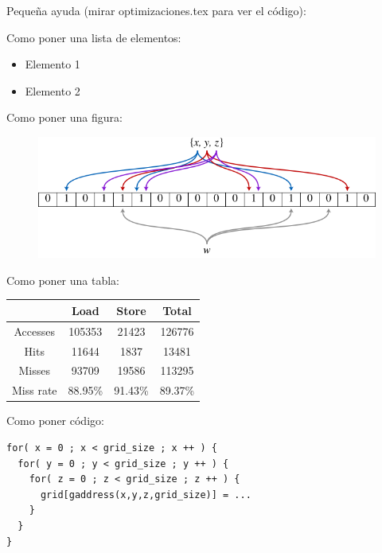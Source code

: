 Peque\~{n}a ayuda (mirar optimizaciones.tex para ver el c\'{o}digo):

Como poner una lista de elementos:
\begin{itemize}
   \item Elemento 1
   \item Elemento 2
\end{itemize}

Como poner una figura:
\begin{figure}[ht]
   \centering
   \includegraphics[keepaspectratio=true,width=.6\textwidth]{figures/muestra}
\end{figure}

Como poner una tabla:
\begin{center}
   \begin{tabular}{| c || c | c | c |}
      \hline
      	           & Load	& Store		& Total		\\ \hline \hline
	Accesses   & 105353	& 21423		& 126776	\\ \hline
	Hits       &  11644	&  1837		&  13481	\\ \hline
	Misses     &  93709 	& 19586		& 113295	\\ \hline
	Miss rate  & 88.95\%	& 91.43\%	& 89.37\%	\\ \hline
   \end{tabular}
\end{center}

Como poner c\'{o}digo:

\begin{lstlisting}[]
for( x = 0 ; x < grid_size ; x ++ ) {
  for( y = 0 ; y < grid_size ; y ++ ) {
    for( z = 0 ; z < grid_size ; z ++ ) {
      grid[gaddress(x,y,z,grid_size)] = ...
    }
  }
}
\end{lstlisting}

